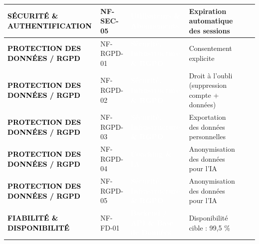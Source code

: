 \begin{longtable}{|P{2.15cm}|P{1.55cm}|P{2.35cm}|P{5.60cm}|P{1.65cm}|P{1.45cm}|}
\textcolor{black}{\textbf{SÉCURITÉ \& AUTHENTIFICATION}} & NF-SEC-05 & \textcolor{white}{\textbf{Utilisateurs \& Abonnements}} & Expiration automatique des sessions &  &  \\ \hline
{}
\textcolor{black}{\textbf{PROTECTION DES DONNÉES / RGPD}} & NF-RGPD-01 & \textcolor{white}{\textbf{Sécurité, Infrastructure \& RGPD}} & Consentement explicite &  &  \\ \hline
{}
\textcolor{black}{\textbf{PROTECTION DES DONNÉES / RGPD}} & NF-RGPD-02 & \textcolor{white}{\textbf{Sécurité, Infrastructure \& RGPD}} & Droit à l’oubli (suppression compte + données) &  &  \\ \hline
{}
\textcolor{black}{\textbf{PROTECTION DES DONNÉES / RGPD}} & NF-RGPD-03 & \textcolor{white}{\textbf{Sécurité, Infrastructure \& RGPD}} & Exportation des données personnelles &  &  \\ \hline
{}
\textcolor{black}{\textbf{PROTECTION DES DONNÉES / RGPD}} & NF-RGPD-04 & \textcolor{white}{\textbf{Coaching \& IA}} & Anonymisation des données pour l’IA &  &  \\ \hline
{}
\textcolor{black}{\textbf{PROTECTION DES DONNÉES / RGPD}} & NF-RGPD-05 & \textcolor{white}{\textbf{Sécurité, Infrastructure \& RGPD}} & Anonymisation des données pour l’IA &  &  \\ \hline
{}
\textcolor{black}{\textbf{FIABILITÉ \& DISPONIBILITÉ}} & NF-FD-01 & \textcolor{white}{\textbf{Backend / API \& Base de Données}} & Disponibilité cible : 99,5 \% &  &  \\ \hline

\end{longtable}
